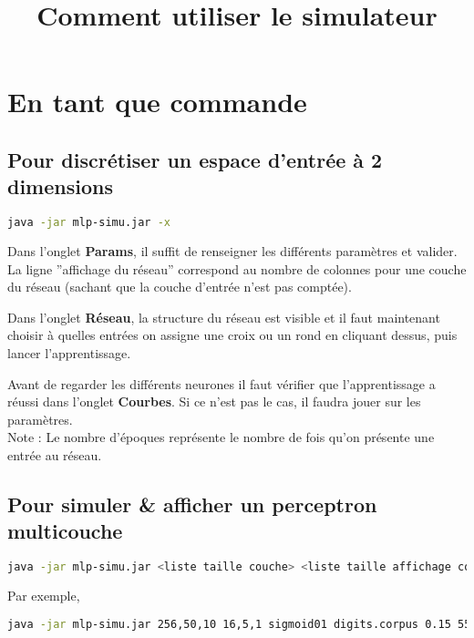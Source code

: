 \documentclass[a4paper,11pt]{article}
\title{Comment utiliser le simulateur}
\author{}
\date{}
\begin{document}
\maketitle

\section{En tant que commande}

\subsection{Pour discrétiser un espace d'entrée à 2 dimensions}

\begin{lstlisting}[language={sh}]
java -jar mlp-simu.jar -x
\end{lstlisting}

Dans l'onglet \textbf{Params}, il suffit de renseigner les différents paramètres et valider.
La ligne ''affichage du réseau'' correspond au nombre de colonnes pour une couche du réseau 
(sachant que la couche d'entrée n'est pas comptée).

Dans l'onglet \textbf{Réseau}, la structure du réseau est visible et il faut maintenant choisir
à quelles entrées on assigne une croix ou un rond en cliquant dessus, puis lancer l'apprentissage.

Avant de regarder les différents neurones il faut vérifier que l'apprentissage a réussi 
dans l'onglet \textbf{Courbes}. Si ce n'est pas le cas, il faudra jouer sur les paramètres.\\
Note : Le nombre d'époques représente le nombre de fois qu'on présente une entrée au réseau.

\subsection{Pour simuler \& afficher un perceptron multicouche}

\begin{lstlisting}[language={sh}]
java -jar mlp-simu.jar <liste taille couche> <liste taille affichage couche> <fonction transfert> <fichier corpus> <taux apprentissage> <epoques> <precision courbe>
\end{lstlisting}

Par exemple,
\begin{lstlisting}[language={sh}]
java -jar mlp-simu.jar 256,50,10 16,5,1 sigmoid01 digits.corpus 0.15 55000 250
\end{lstlisting}
\end{document}
